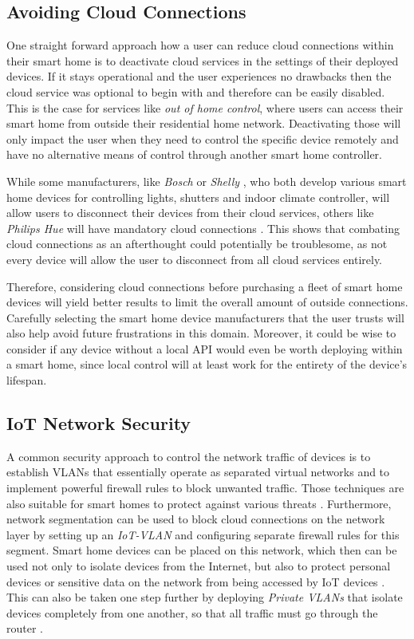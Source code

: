 \subsection{Avoiding Cloud Connections}
One straight forward approach how a user can reduce cloud connections within their smart home is to deactivate cloud services in the settings of their deployed devices. If it stays operational and the user experiences no drawbacks then the cloud service was optional to begin with and therefore can be easily disabled. This is the case for services like \textit{out of home control}, where users can access their smart home from outside their residential home network. Deactivating those will only impact the user when they need to control the specific device remotely and have no alternative means of control through another smart home controller. 

While some manufacturers, like \textit{Bosch} \cite{BoschHelpSmartController} or \textit{Shelly} \cite{ShellySmartControlApp}, who both develop various smart home devices for controlling lights, shutters and indoor climate controller, will allow users to disconnect their devices from their cloud services, others like \textit{Philips Hue} will have mandatory cloud connections \cite{Tuohy2023PhiliphHue}. This shows that combating cloud connections as an afterthought could potentially be troublesome, as not every device will allow the user to disconnect from all cloud services entirely.

Therefore, considering cloud connections before purchasing a fleet of smart home devices will yield better results to limit the overall amount of outside connections. Carefully selecting the smart home device manufacturers that the user trusts will also help avoid future frustrations in this domain. Moreover, it could be wise to consider if any device without a local API would even be worth deploying within a smart home, since local control will at least work for the entirety of the device's lifespan. 

\subsection{IoT Network Security}
A common security approach to control the network traffic of devices is to establish VLANs that essentially operate as separated virtual networks and to implement powerful firewall rules to block unwanted traffic. Those techniques are also suitable for smart homes to protect against various threats \cite{SH-NetworkSecurity-9990734}. Furthermore, network segmentation can be used to block cloud connections on the network layer by setting up an \textit{IoT-VLAN} and configuring separate firewall rules for this segment. Smart home devices can be placed on this network, which then can be used not only to isolate devices from the Internet, but also to protect personal devices or sensitive data on the network from being accessed by IoT devices \cite{BMI-SmartHomeSecurity}. This can also be taken one step further by deploying \textit{Private VLANs} that isolate devices completely from one another, so that all traffic must go through the router \cite{SH-NetworkSecurity-9990734}.

